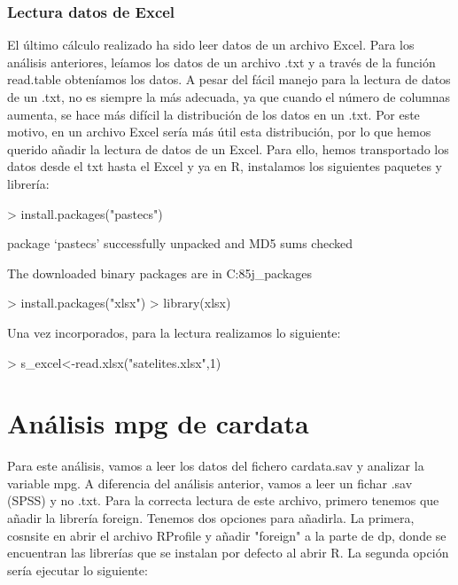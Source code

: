 \documentclass [a4paper] {article}
\begin{document}
\subsubsection{Lectura datos de Excel}
El último cálculo realizado ha sido leer datos de un archivo Excel. Para los análisis anteriores, leíamos los
datos de un archivo .txt y a través de la función read.table obteníamos los datos. A pesar del fácil manejo para 
la lectura de datos de un .txt, no es siempre la más adecuada, ya que cuando el número de columnas aumenta,
se hace más difícil la distribución de los datos en un .txt. Por este motivo, en un archivo Excel sería más 
útil esta distribución, por lo que hemos querido añadir la lectura de datos de un Excel.
Para ello, hemos transportado los  datos desde el txt hasta el Excel y 
ya en R, instalamos los siguientes paquetes y librería:


\begin{Schunk}
\begin{Sinput}
> install.packages("pastecs")
\end{Sinput}
\begin{Soutput}
package ‘pastecs’ successfully unpacked and MD5 sums checked

The downloaded binary packages are in
	C:\Users\Javier\AppData\Local\Temp\RtmpKes85j\downloaded_packages
\end{Soutput}
\begin{Sinput}
> install.packages("xlsx")
> library(xlsx)
\end{Sinput}
\end{Schunk}

Una vez incorporados, para la lectura realizamos lo siguiente:

\begin{Schunk}
\begin{Sinput}
> s_excel<-read.xlsx("satelites.xlsx",1)
\end{Sinput}
\end{Schunk}


\section{Análisis mpg de cardata}
Para este análisis, vamos a leer los datos del fichero cardata.sav y analizar la variable mpg. A diferencia del
análisis anterior, vamos a leer un fichar .sav (SPSS) y no .txt. Para la correcta lectura de este archivo, primero
tenemos que añadir la librería foreign. Tenemos dos opciones para añadirla. La primera, cosnsite en 
abrir el archivo RProfile y añadir "foreign" a la parte de dp, donde se encuentran
las librerías que se instalan por defecto al abrir R. La segunda opción sería ejecutar lo siguiente:
\end{document}
